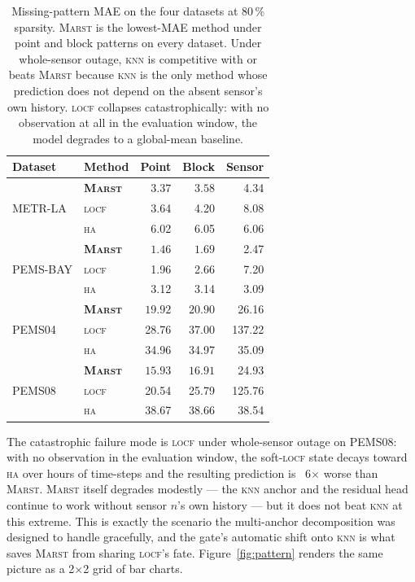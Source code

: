 \documentclass[11pt]{article}
\newcommand{\MARST}{\textsc{Marst}\xspace}
\newcommand{\LOCF}{\textsc{locf}\xspace}
\newcommand{\HA}{\textsc{ha}\xspace}
\newcommand{\KNN}{\textsc{knn}\xspace}
\begin{document}
\begin{table}[!htbp]
\centering
\caption{Missing-pattern MAE on the four datasets at 80\,\% sparsity.
\MARST is the lowest-MAE method under point and block patterns on
every dataset.  Under whole-sensor outage, \KNN is competitive with or
beats \MARST because \KNN is the only method whose prediction does not
depend on the absent sensor's own history.  \LOCF collapses
catastrophically: with no observation at all in the evaluation window,
the model degrades to a global-mean baseline.}
\label{tab:pattern}
\small
\begin{tabular}{llrrr}
\toprule
\textbf{Dataset} & \textbf{Method} & \textbf{Point} & \textbf{Block} & \textbf{Sensor} \\
\midrule
\multirow{3}{*}{METR-LA}  & \textbf{\MARST} & $\mathbf{3.37}$ & $\mathbf{3.58}$ & 4.34 \\
                           & \LOCF           & 3.64            & 4.20            & 8.08 \\
                           & \HA             & 6.02            & 6.05            & 6.06 \\
\midrule
\multirow{3}{*}{PEMS-BAY} & \textbf{\MARST} & $\mathbf{1.46}$ & $\mathbf{1.69}$ & 2.47 \\
                           & \LOCF           & 1.96            & 2.66            & 7.20 \\
                           & \HA             & 3.12            & 3.14            & 3.09 \\
\midrule
\multirow{3}{*}{PEMS04}   & \textbf{\MARST} & $\mathbf{19.92}$ & $\mathbf{20.90}$ & 26.16 \\
                           & \LOCF           & 28.76            & 37.00            & 137.22 \\
                           & \HA             & 34.96            & 34.97            & 35.09 \\
\midrule
\multirow{3}{*}{PEMS08}   & \textbf{\MARST} & $\mathbf{15.93}$ & $\mathbf{16.91}$ & 24.93 \\
                           & \LOCF           & 20.54            & 25.79            & 125.76 \\
                           & \HA             & 38.67            & 38.66            & 38.54 \\
\bottomrule
\end{tabular}
\end{table}

The catastrophic failure mode is \LOCF under whole-sensor outage on
PEMS08: with no observation in the evaluation window, the soft-\LOCF
state decays toward \HA over hours of time-steps and the resulting
prediction is ~6$\times$ worse than \MARST.  \MARST itself degrades
modestly --- the \KNN anchor and the residual head continue to work
without sensor $n$'s own history --- but it does not beat \KNN at this
extreme.  This is exactly the scenario the multi-anchor decomposition
was designed to handle gracefully, and the gate's automatic shift onto
\KNN is what saves \MARST from sharing \LOCF{}'s fate.
Figure~\ref{fig:pattern} renders the same picture as a 2$\times$2 grid
of bar charts.
\end{document}
